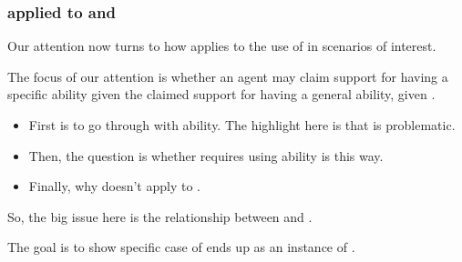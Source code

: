 \newpage

\subsubsection{\nI{} applied to \gsi{} and \nr{}}
\label{sec:ni-applies-ar}

\begin{note}
  Our attention now turns to how \nI{} applies to the use of  in scenarios of interest.

  The focus of our attention is whether an agent may claim support for having a specific ability given the claimed support for having a general ability, given \gsi{}.
\end{note}


\begin{note}
  \begin{itemize}
  \item First is to go through \nI{} with ability.
    The highlight here is that \RBV{} is problematic.
  \item Then, the question is whether \nr{} requires using ability is this way.
  \item Finally, why \nI{} doesn't apply to \ur{}.
  \end{itemize}

  So, the big issue here is the relationship between \RBV{} and \nI{}.

  The goal is to show specific case of \nI{} ends up as an instance of \RBV{}.

  
\end{note}

